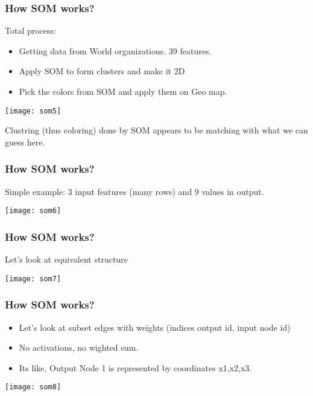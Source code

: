 \begin{frame}[fragile] \frametitle{How SOM works?}
Total process:
\begin{itemize}
\item Getting data from World organizations. 39 features.
\item Apply SOM to form clusters and make it 2D
\item Pick the colors from SOM and apply them on Geo map.
\end{itemize}

\begin{center}
\texttt{[image: som5]}
\end{center}

Clustring (thus coloring) done by SOM appears to be matching with what we can guess here.
\end{frame}


\begin{frame}[fragile] \frametitle{How SOM works?}
Simple example: 3 input features (many rows) and 9 values in output.

\begin{center}
\texttt{[image: som6]}
\end{center}
\end{frame}

\begin{frame}[fragile] \frametitle{How SOM works?}
Let's look at equivalent structure

\begin{center}
\texttt{[image: som7]}
\end{center}
\end{frame}

\begin{frame}[fragile] \frametitle{How SOM works?}
\begin{itemize}
\item Let's look at subset edges with weights (indices output id, input node id)
\item No activations, no wighted sum.
\item Its like, Output Node 1 is represented by coordinates x1,x2,x3.
\end{itemize}
\begin{center}
\texttt{[image: som8]}
\end{center}
\end{frame}

